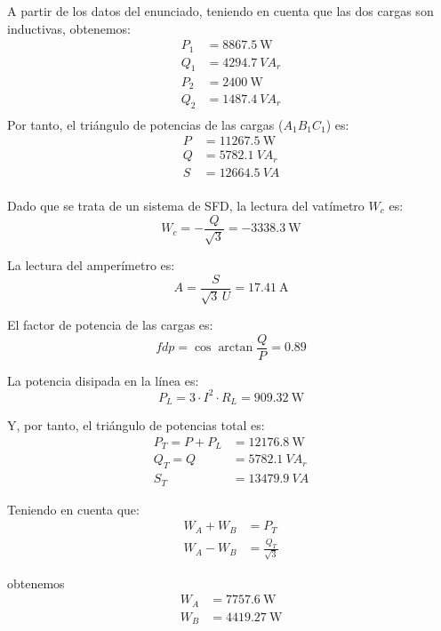 A partir de los datos del enunciado, teniendo en cuenta que las dos
cargas son inductivas, obtenemos:
\begin{align*}
  P_1 &= \SI{8867.5}{\watt}\\
  Q_1 &= \SI{4294.7}{VA}_r\\
  P_2 &= \SI{2400}{\watt}\\
  Q_2 &= \SI{1487.4}{VA}_r\\
\end{align*}
Por tanto, el triángulo de potencias de las cargas ($A_1B_1C_1$) es:
\begin{align*}
  P &= \SI{11267.5}{\watt}\\
  Q &= \SI{5782.1}{VA}_r\\
  S &= \SI{12664.5}{VA}\\
\end{align*}

Dado que se trata de un sistema de SFD, la lectura del vatímetro $W_c$
es:
\begin{equation*}
  W_c = - \frac{Q}{\sqrt{3}} = \SI{-3338.3}{\watt}
\end{equation*}

La lectura del amperímetro es:
\begin{equation*}
  A = \frac{S}{\sqrt{3} \,U} = \SI{17.41}{\ampere}
\end{equation*}

El factor de potencia de las cargas es:
\begin{equation*}
  fdp = \cos{\arctan{\frac{Q}{P}}} = 0.89
\end{equation*}

La potencia disipada en la línea es:
\begin{equation*}
  P_L = 3 \cdot I^2 \cdot R_L = \SI{909.32}{\watt}
\end{equation*}

Y, por tanto, el triángulo de potencias total es:
\begin{align*}
  P_T = P + P_L &= \SI{12176.8}{\watt}\\
  Q_T = Q &= \SI{5782.1}{VA}_r\\
  S_T &= \SI{13479.9}{VA}
\end{align*}

Teniendo en cuenta que:
\begin{align*}
  W_A + W_B &= P_T\\
  W_A - W_B &= \frac{Q_T}{\sqrt{3}}
\end{align*}

obtenemos
\begin{align*}
  W_A &= \SI{7757.6}{\watt}\\
  W_B &= \SI{4419.27}{\watt}
\end{align*}

